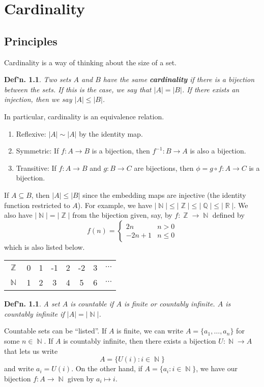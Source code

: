 \documentclass[12pt, a4paper]{book}
\DeclareMathOperator{\N}{\mathbb{N}}
\DeclareMathOperator{\Q}{\mathbb{Q}}
\DeclareMathOperator{\Z}{\mathbb{Z}}
\DeclareMathOperator{\R}{\mathbb{R}}
\newtheorem{definition}[theorem]{Def'n.}
\theoremstyle{nonumberplain}
\begin{document}
\chapter{Cardinality}
\section{Principles}
Cardinality is a way of thinking about the size of a set.
\begin{definition}
    Two sets $A$ and $B$ have the same \textbf{cardinality} if there is a bijection between the sets. If this is the case, we
    say that $|A|=|B|$. If there exists an injection, then we say $|A|\leq|B|$.
\end{definition}
In particular, cardinality is an equivalence relation.
\begin{enumerate}
    \item Reflexive: $|A|\sim|A|$ by the identity map.
    \item Symmetric: If $f:A\to B$ is a bijection, then $f^{-1}:B\to A$ is also a bijection.
    \item Transitive: If $f:A\to B$ and $g:B\to C$ are bijections, then $\phi=g\circ f:A\to C$ is a bijection.
\end{enumerate}
If $A\subseteq B$, then $|A|\leq|B|$ since the embedding maps are injective (the identity function restricted to $A$).
For example, we have $|\N|\leq|\Z|\leq|\Q|\leq|\R|$. We also have $|\N|=|\Z|$ from the bijection given, say, by $f:\Z\to\N$
defined by
\[f(n)=
\begin{cases}
    2n & n>0\\
    -2n+1 & n\leq 0
\end{cases}
\]
which is also listed below.
\begin{center}
    \begin{tabular}{cccccccc}
        $\Z$&0&1&-1&2&-2&3&$\cdots$\\
        $\N$&1&2&3 &4&5 &6&$\cdots$
    \end{tabular}
\end{center}
\begin{definition}
    A set $A$ is countable if $A$ is finite or countably infinite. $A$ is countably infinite if $|A|=|\N|$.
\end{definition}
Countable sets can be ``listed''. If $A$ is finite, we can write $A=\{a_1,\dots,a_n\}$ for some $n\in\N$. If $A$ is countably
infinite, then there exists a bijection $U:\N\to A$ that lets us write
\[A=\{U(i):i\in\N\}\]
and write $a_i=U(i)$. On the other hand, if $A=\{a_i:i\in\N\}$, we have our bijection $f:A\to\N$ given by $a_i\mapsto i$.
\end{document}

